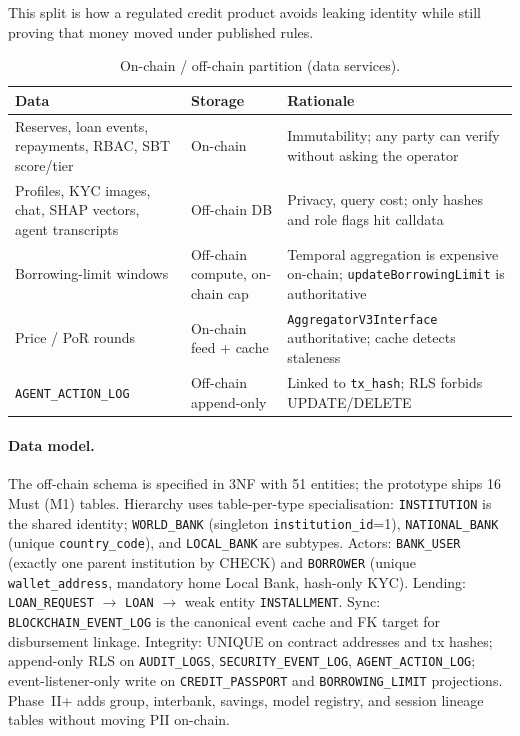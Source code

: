 \documentclass[11pt,a4paper]{article}
\newcommand{\tablehead}{\rowcolor{HeadShade}\bfseries}
\begin{document}
This split is how a regulated credit product avoids leaking identity while still proving that money moved under published rules.

\begin{table}[H]
\centering
\footnotesize
\caption{On-chain / off-chain partition (data services).}
\label{tab:partition}
\begin{tabular}{@{}>{\raggedright\arraybackslash}p{4.6cm}p{2.2cm}>{\raggedright\arraybackslash}p{6.9cm}@{}}
\toprule
\tablehead Data & Storage & Rationale \\
\midrule
Reserves, loan events, repayments, RBAC, SBT score/tier & On-chain & Immutability; any party can verify without asking the operator \\
\rowcolor{RowShade}
Profiles, KYC images, chat, SHAP vectors, agent transcripts & Off-chain DB & Privacy, query cost; only hashes and role flags hit calldata \\
Borrowing-limit windows & Off-chain compute, on-chain cap & Temporal aggregation is expensive on-chain; \texttt{updateBorrowingLimit} is authoritative \\
\rowcolor{RowShade}
Price / PoR rounds & On-chain feed + cache & \texttt{AggregatorV3Interface} authoritative; cache detects staleness \\
\texttt{AGENT\_ACTION\_LOG} & Off-chain append-only & Linked to \texttt{tx\_hash}; RLS forbids UPDATE/DELETE \\
\bottomrule
\end{tabular}
\end{table}

\paragraph{Data model.}
The off-chain schema is specified in 3NF with 51 entities; the prototype ships 16 Must (M1) tables. Hierarchy uses table-per-type specialisation: \texttt{INSTITUTION} is the shared identity; \texttt{WORLD\_BANK} (singleton \texttt{institution\_id}=1), \texttt{NATIONAL\_BANK} (unique \texttt{country\_code}), and \texttt{LOCAL\_BANK} are subtypes. Actors: \texttt{BANK\_USER} (exactly one parent institution by CHECK) and \texttt{BORROWER} (unique \texttt{wallet\_address}, mandatory home Local Bank, hash-only KYC). Lending: \texttt{LOAN\_REQUEST} $\to$ \texttt{LOAN} $\to$ weak entity \texttt{INSTALLMENT}. Sync: \texttt{BLOCKCHAIN\_EVENT\_LOG} is the canonical event cache and FK target for disbursement linkage. Integrity: UNIQUE on contract addresses and tx hashes; append-only RLS on \texttt{AUDIT\_LOGS}, \texttt{SECURITY\_EVENT\_LOG}, \texttt{AGENT\_ACTION\_LOG}; event-listener-only write on \texttt{CREDIT\_PASSPORT} and \texttt{BORROWING\_LIMIT} projections. Phase~II+ adds group, interbank, savings, model registry, and session lineage tables without moving PII on-chain.
\end{document}
